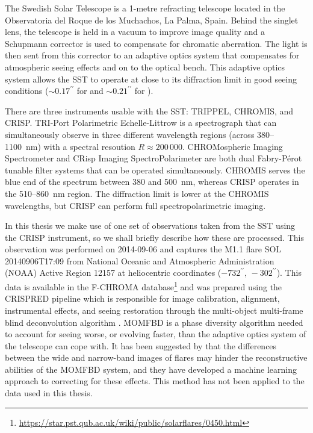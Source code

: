 The Swedish Solar Telescope \citep[SST,][]{Scharmer2003} is a 1-metre refracting telescope located in the Observatoria del Roque de los Muchachos, La Palma, Spain.
Behind the singlet lens, the telescope is held in a vacuum to improve image quality and a Schupmann corrector is used to compensate for chromatic aberration.
The light is then sent from this corrector to an adaptive optics system that compensates for atmospheric seeing effects and on to the optical bench.
This adaptive optics system allows the SST to operate at close to its diffraction limit in good seeing conditions ($\sim 0.17^{\prime\prime}$ for \Ha{} and $\sim 0.21^{\prime\prime}$ for \CaLine{}). %

There are three instruments usable with the SST: TRIPPEL, CHROMIS, and CRISP.
TRI-Port Polarimetric Echelle-Littrow \citep[TRIPPEL, ][]{Kiselman2011} is a spectrograph that can simultaneously observe in three different wavelength regions (across 380--\SI{1100}{\nano\m}) with a spectral resoution $R\approx200\,000$.
CHROMospheric Imaging Spectrometer \citep[CHROMIS, ][]{Lofdahl2021} and CRisp Imaging SpectroPolarimeter \citep[CRISP, ][]{Scharmer2008,Scharmer2019} are both dual Fabry-Pérot tunable filter systems that can be operated simultaneously.
CHROMIS serves the blue end of the spectrum between 380 and \SI{500}{\nano\m}, whereas CRISP operates in the 510--\SI{860}{\nano\m} region.
The diffraction limit is lower at the CHROMIS wavelengths, but CRISP can perform full spectropolarimetric imaging.

In this thesis we make use of one set of observations taken from the SST using the CRISP instrument, so we shall briefly describe how these are processed.
This observation was performed on 2014-09-06 and captures the M1.1 flare SOL 20140906T17:09 from National Oceanic and Atmospheric Administration (NOAA) Active Region 12157 at heliocentric coordinates ($-732^{\prime\prime},\,-302^{\prime\prime}$).
This data is available in the F-CHROMA database\footnote{\url{https://star.pst.qub.ac.uk/wiki/public/solarflares/0450.html}} and was prepared using the CRISPRED pipeline \citep{DelaCruzRodriguez2015} which is responsible for image calibration, alignment, instrumental effects, and seeing restoration through the multi-object multi-frame blind deconvolution algorithm \citep[MOMFBD, ][]{VanNoort2005}.
MOMFBD is a phase diversity algorithm needed to account for seeing worse, or evolving faster, than the adaptive optics system of the telescope can cope with.
It has been suggested by \citet{Armstrong2021} that the differences between the wide and narrow-band images of flares may hinder the reconstructive abilities of the MOMFBD system, and they have developed a machine learning approach to correcting for these effects.
This method has not been applied to the data used in this thesis.

